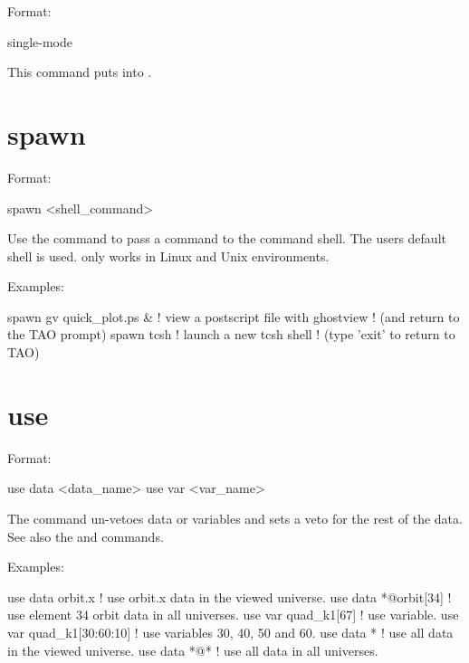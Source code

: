 {{{{Format:
\begin{example}
  single-mode
\end{example}

\vskip 0.2in 
This command puts \tao into . 

\section{spawn}
\label{s:spawn}

Format:
\begin{example}
  spawn <shell_command>
\end{example}

\vskip 0.2in
Use the  command to pass a command to the command shell.  The users
default shell is used.  only works in Linux and Unix environments.

Examples:
\begin{example}
  spawn gv quick_plot.ps &      ! view a postscript file with ghostview
                                ! (and return to the TAO prompt)
  spawn tcsh                    ! launch a new tcsh shell 
                                ! (type 'exit' to return to TAO)
\end{example}

\section{use}
\label{s:use}

Format:
\begin{example}
  use data  <data_name>
  use var <var_name>
\end{example}

\vskip 0.2in 
The  command un-vetoes data or variables and sets a veto for
the rest of the data. See also the  and 
commands.

Examples:
\begin{example}
  use data orbit.x             ! use orbit.x data in the viewed universe.
  use data *@orbit[34]         ! use element 34 orbit data in all universes.
  use var quad_k1[67]          ! use variable.
  use var quad_k1[30:60:10]    ! use variables 30, 40, 50 and 60.
  use data *                   ! use all data in the viewed universe.
  use data *@*                 ! use all data in all universes.
\end{example}


}}}}
